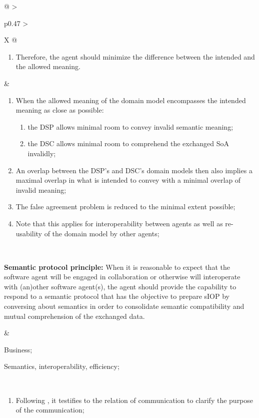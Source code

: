 \begin{xltabular}[l]{\linewidth}{@{} >{\small\raggedright\arraybackslash}p{0.47\linewidth} >{\small\raggedright\arraybackslash}X @{}}
\begin{enumerate}[left=6pt, nosep]
  \item Therefore, the agent should minimize the difference between the intended and the allowed meaning.
\end{enumerate}
&
\begin{enumerate}[left=10pt, nosep]
  \item When the allowed meaning of the domain model encompasses the intended meaning as close as possible:
  \begin{enumerate}
    \item the DSP allows minimal room to convey invalid semantic meaning;
    \item the DSC allows minimal room to comprehend the exchanged SoA invalidly;
  \end{enumerate}
  \item An overlap between the DSP's and DSC's domain models then also implies a maximal overlap in what is intended to convey with a minimal overlap of invalid meaning; 
  \item The false agreement problem is reduced to the minimal extent possible;
  \item Note that this applies for interoperability between agents as well as re-usability of the domain model by other agents;
\end{enumerate} \\
%
%
%
\begin{mmdp}\label{dp:spp}{\bfseries Semantic protocol principle:}
\quad When it is reasonable to expect that the software agent will be engaged in collaboration or otherwise will interoperate with (an)other software agent(s), the agent should provide the capability to respond to a semantic protocol that has the objective to prepare sIOP by conversing about semantics in order to consolidate semantic compatibility and mutual comprehension of the exchanged data.
\end{mmdp}
&
\begin{description}[labelwidth=3.7cm,leftmargin=3.7cm+1ex,nosep,topsep=2ex,labelsep=1ex,font=\bfseries]
  \item[Type of information:] Business;
  \item[Quality attributes:] Semantics, interoperability, efficiency;
\end{description} \\
\begin{enumerate}[left=6pt, nosep]
  \item Following \cite{Grice:1991BT}, it testifies to the relation of communication to clarify the purpose of the communication;

\end{enumerate}
\end{xltabular}
